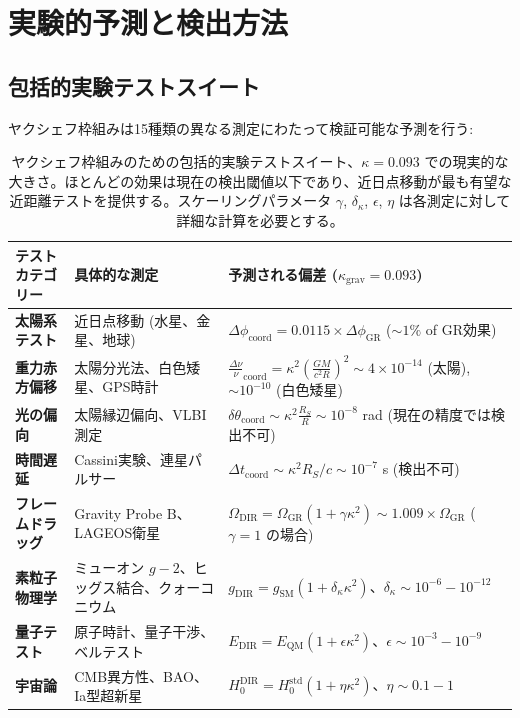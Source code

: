 \documentclass[11pt,a4paper]{article}
\begin{document}
	\section{実験的予測と検出方法}
	\subsection{包括的実験テストスイート}
	
	ヤクシェフ枠組みは15種類の異なる測定にわたって検証可能な予測を行う:
	
	\begin{table}[htbp]
		\centering
		\scriptsize
	
			\begin{tabular}{p{}p{0.35\textwidth}p{}}
				\toprule
				\textbf{テストカテゴリー} & \textbf{具体的な測定} & \textbf{予測される偏差 ($\kappa_{\text{grav}} = 0.093$)} \\
				\midrule
				\textbf{太陽系テスト} & 
				近日点移動 (水星、金星、地球) &
				$\Delta\phi_{\text{coord}} = 0.0115 \times \Delta\phi_{\text{GR}}$ ($\sim 1\%$ of GR効果) \\
				\hline
				\textbf{重力赤方偏移} &
				太陽分光法、白色矮星、GPS時計 &
				$\frac{\Delta\nu}{\nu}_{\text{coord}} = \kappa^2\left(\frac{GM}{c^2R}\right)^2 \sim 4\times10^{-14}$ (太陽), $\sim 10^{-10}$ (白色矮星) \\
				\hline
				\textbf{光の偏向} &
				太陽縁辺偏向、VLBI測定 &
				$\delta\theta_{\text{coord}} \sim \kappa^2 \frac{R_S}{R} \sim 10^{-8}$ rad (現在の精度では検出不可) \\
				\hline
				\textbf{時間遅延} &
				Cassini実験、連星パルサー &
				$\Delta t_{\text{coord}} \sim \kappa^2 R_S/c \sim 10^{-7}$ s (検出不可) \\
				\hline
				\textbf{フレームドラッグ} &
				Gravity Probe B、LAGEOS衛星 &
				$\Omega_{\text{DIR}} = \Omega_{\text{GR}} (1 + \gamma \kappa^2) \sim 1.009 \times \Omega_{\text{GR}}$ ($\gamma=1$ の場合) \\
				\hline
				\textbf{素粒子物理学} &
				ミューオン $g-2$、ヒッグス結合、クォーコニウム &
				$g_{\text{DIR}} = g_{\text{SM}} (1 + \delta_\kappa \kappa^2)$、$\delta_\kappa \sim 10^{-6} - 10^{-12}$ \\
				\hline
				\textbf{量子テスト} &
				原子時計、量子干渉、ベルテスト &
				$E_{\text{DIR}} = E_{\text{QM}} (1 + \epsilon \kappa^2)$、$\epsilon \sim 10^{-3} - 10^{-9}$ \\
				\hline
				\textbf{宇宙論} &
				CMB異方性、BAO、Ia型超新星 &
				$H_0^{\text{DIR}} = H_0^{\text{std}} (1 + \eta \kappa^2)$、$\eta \sim 0.1 - 1$ \\
				\bottomrule
			\end{tabular}
	
		\caption{ヤクシェフ枠組みのための包括的実験テストスイート、$\kappa = 0.093$ での現実的な大きさ。ほとんどの効果は現在の検出閾値以下であり、近日点移動が最も有望な近距離テストを提供する。スケーリングパラメータ $\gamma$, $\delta_\kappa$, $\epsilon$, $\eta$ は各測定に対して詳細な計算を必要とする。}
	\end{table}
	
\end{document}
